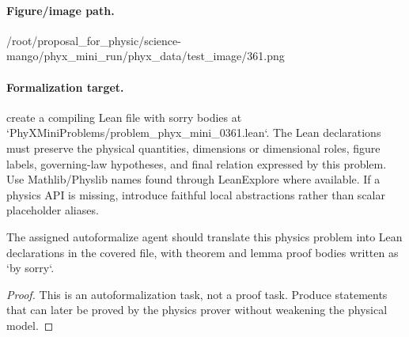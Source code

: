 \paragraph{Figure/image path.}
/root/proposal\_for\_physic/science-mango/phyx\_mini\_run/phyx\_data/test\_image/361.png

\paragraph{Formalization target.}
create a compiling Lean file with sorry bodies at `PhyXMiniProblems/problem\_phyx\_mini\_0361.lean`. The Lean declarations must preserve the physical quantities, dimensions or dimensional roles, figure labels, governing-law hypotheses, and final relation expressed by this problem.
Use Mathlib/Physlib names found through LeanExplore where available. If a physics API is missing, introduce faithful local abstractions rather than scalar placeholder aliases.

\begin{theorem}
\label{thm:physics:phyx_mini_0361:target}
The assigned autoformalize agent should translate this physics problem into Lean declarations in the covered file, with theorem and lemma proof bodies written as `by sorry`.
\end{theorem}
\begin{proof}
This is an autoformalization task, not a proof task. Produce statements that can later be proved by the physics prover without weakening the physical model.
\end{proof}

